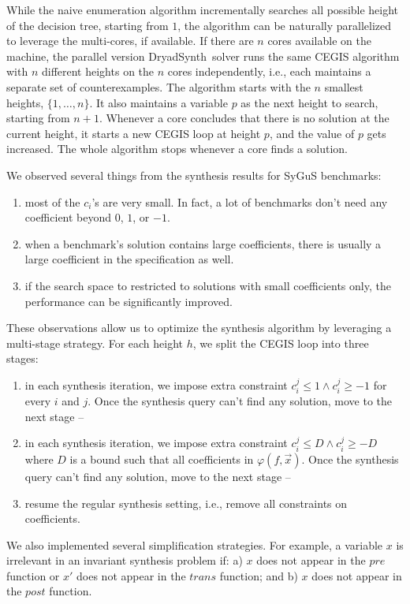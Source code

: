 \documentclass[conference]{IEEEtran}
\newcommand{\DryadSynth}{{\sc DryadSynth~}}
\begin{document}
While the naive enumeration algorithm incrementally searches all possible height of the decision tree, starting from $1$, the algorithm can be naturally parallelized to leverage the multi-cores, if available. If there are $n$ cores available on the machine, the parallel version \DryadSynth solver runs the same CEGIS algorithm with $n$ different heights on the $n$ cores independently, i.e., each maintains a separate set of counterexamples. The algorithm starts with the $n$ smallest heights, $\{1, \dots, n\}$. It also maintains a variable $p$ as the next height to search, starting from $n+1$. Whenever a core concludes that there is no solution at the current height, it starts a new CEGIS loop at height $p$, and the value of $p$ gets increased. The whole algorithm stops whenever a core finds a solution.

We observed several things from the synthesis results for SyGuS benchmarks:
\begin{enumerate}
\item most of the $c_i$'s are very small. In fact, a lot of benchmarks don't need any coefficient beyond $0$, $1$, or $-1$.
\item when a benchmark's solution contains large coefficients, there is usually a large coefficient in the specification as well.
\item if the search space to restricted to solutions with small coefficients only, the performance can be significantly improved.
\end{enumerate}
These observations allow us to optimize the synthesis algorithm by leveraging a multi-stage strategy. For each height $h$, we split the CEGIS loop into three stages:
\begin{enumerate}
\item in each synthesis iteration, we impose extra constraint $c_i^j \leq 1 \wedge c_i^j \geq -1$ for every $i$ and $j$. Once the synthesis query can't find any solution, move to the next stage --
\item in each synthesis iteration, we impose extra constraint $c_i^j \leq D \wedge c_i^j \geq -D$ where $D$ is a bound such that all coefficients in $\varphi(f, \vec{x})$. Once the synthesis query can't find any solution, move to the next stage --
\item resume the regular synthesis setting, i.e., remove all constraints on coefficients.
\end{enumerate}

We also implemented several simplification strategies. For example, a variable $x$ is irrelevant in an invariant synthesis problem if: a) $x$ does not appear in the $pre$ function or $x'$ does not appear in the $trans$ function; and b) $x$ does not appear in the $post$ function.
\end{document}
